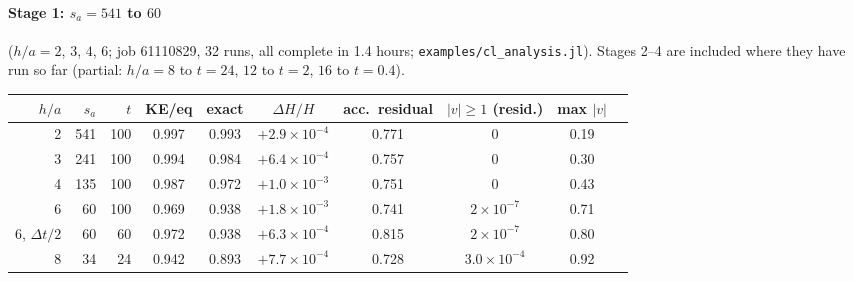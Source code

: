 \documentclass[11pt,aps,preprint,nofootinbib,superscriptaddress,tightenlines]{revtex4-2}
\let\oldparagraph\paragraph
\renewcommand{\paragraph}{\par\bigskip\oldparagraph}
\begin{document}
\paragraph{Stage 1: $s_a=541$ to $60$} ($h/a=2$, $3$, $4$, $6$; job 61110829, 32 runs, all complete
in 1.4 hours; \texttt{examples/cl\_analysis.jl}).  Stages 2--4 are included where they have run
so far (partial: $h/a=8$ to $t=24$, $12$ to $t=2$, $16$ to $t=0.4$).
\begin{center}
\begin{tabular}{rrrccccccc}
\hline
$h/a$ & $s_a$ & $t$ & KE/eq & exact & $\Delta H/H$ & acc.\ residual & $|v|\ge1$ (resid.) & max $|v|$ \\ \hline
2 & 541 & 100 & 0.997 & 0.993 & $+2.9\times10^{-4}$ & 0.771 & 0 & 0.19 \\
3 & 241 & 100 & 0.994 & 0.984 & $+6.4\times10^{-4}$ & 0.757 & 0 & 0.30 \\
4 & 135 & 100 & 0.987 & 0.972 & $+1.0\times10^{-3}$ & 0.751 & 0 & 0.43 \\
6 & 60 & 100 & 0.969 & 0.938 & $+1.8\times10^{-3}$ & 0.741 & $2\times10^{-7}$ & 0.71 \\
6, $\Delta t/2$ & 60 & 60 & 0.972 & 0.938 & $+6.3\times10^{-4}$ & 0.815 & $2\times10^{-7}$ & 0.80 \\
8 & 34 & 24 & 0.942 & 0.893 & $+7.7\times10^{-4}$ & 0.728 & $3.0\times10^{-4}$ & 0.92 \\
\hline
\end{tabular}
\end{center}
\end{document}
